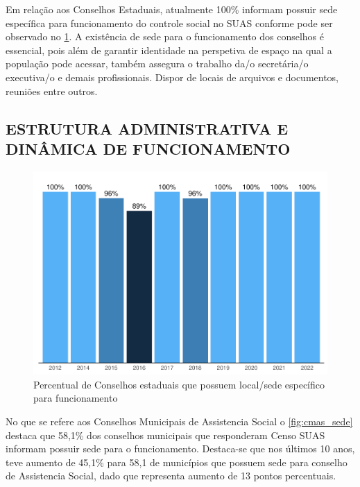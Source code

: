 \documentclass[
  brazilian]{report}
\begin{document}
Em relação aos Conselhos Estaduais, atualmente 100\% informam possuir
sede específica para funcionamento do controle social no SUAS conforme
pode ser observado no \cref{fig:ceas_sede}. A existência de sede para o
funcionamento dos conselhos é essencial, pois além de garantir
identidade na perspetiva de espaço na qual a população pode acessar,
também assegura o trabalho da/o secretária/o executiva/o e demais
profissionais. Dispor de locais de arquivos e documentos, reuniões entre
outros.

\hypertarget{estrutura-administrativa-e-dinuxe2mica-de-funcionamento}{%
\subsection{ESTRUTURA ADMINISTRATIVA E DINÂMICA DE
FUNCIONAMENTO}\label{estrutura-administrativa-e-dinuxe2mica-de-funcionamento}}

\begin{figure}
\includegraphics{Censo-SUAS-2022_files/figure-latex/ceas_sede-1} \caption[Percentual de Conselhos estaduais que possuem local/sede específico para funcionamento]{Percentual de Conselhos estaduais que possuem local/sede específico para funcionamento}\label{fig:ceas_sede}
\end{figure}

No que se refere aos Conselhos Municipais de Assistencia Social o
\cref{fig:cmas_sede} destaca que 58,1\% dos conselhos municipais que
responderam Censo SUAS informam possuir sede para o funcionamento.
Destaca-se que nos últimos 10 anos, teve aumento de 45,1\% para 58,1 de
municípios que possuem sede para conselho de Assistencia Social, dado
que representa aumento de 13 pontos percentuais.
\end{document}
